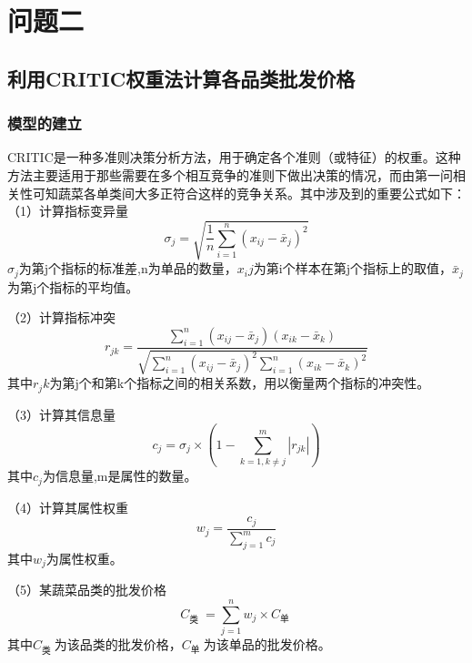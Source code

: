 \documentclass[withoutpreface,bwprint]{cumcmthesis} %
\begin{document}
\section{问题二}
\subsection{利用CRITIC权重法计算各品类批发价格}
\subsubsection{模型的建立}
CRITIC是一种多准则决策分析方法，用于确定各个准则（或特征）的权重。这种方法主要适用于那些需要在多个相互竞争的准则下做出决策的情况，而由第一问相关性可知蔬菜各单类间大多正符合这样的竞争关系。其中涉及到的重要公式如下：
（1）计算指标变异量
\begin{equation}
\sigma_j = \sqrt{\frac{1}{n} \sum_{i=1}^n (x_{ij} - \bar{x}_j)^2}
\end{equation}
$\sigma_j$为第j个指标的标准差,n为单品的数量，$x_ij$为第i个样本在第j个指标上的取值，$\bar{x}_j$为第j个指标的平均值。

（2）计算指标冲突
\begin{equation}
r_{jk} = \frac{\sum_{i=1}^n (x_{ij} - \bar{x}_j)(x_{ik} - \bar{x}_k)}{\sqrt{\sum_{i=1}^n (x_{ij} - \bar{x}_j)^2 \sum_{i=1}^n (x_{ik} - \bar{x}_k)^2}}
\end{equation}
其中$r_jk$为第j个和第k个指标之间的相关系数，用以衡量两个指标的冲突性。

（3）计算其信息量
\begin{equation}
c_j = \sigma_j \times (1 - \sum_{k=1, k \neq j}^m |r_{jk}|)
\end{equation}
其中$c_j$为信息量,m是属性的数量。

（4）计算其属性权重
\begin{equation}
w_j = \frac{c_j}{\sum_{j=1}^m c_j}
\end{equation}
其中$w_j$为属性权重。

（5）某蔬菜品类的批发价格
\begin{equation}
C_{\text {类 }}=\sum_{j=1}^{n} w_{j} \times C_{\text {单 }}
\end{equation}
其中$C_{\text {类 }}$为该品类的批发价格，$C_{\text {单 }}$为该单品的批发价格。
\end{document}
